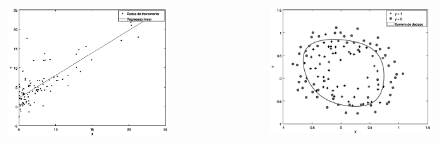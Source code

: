 \documentclass[10pt]{beamer}
\begin{document}
\begin{frame}[fragile]
{  \begin{columns}[onlytextwidth]
    \begin{figure}[htb]
    \begin{center}
        \includegraphics[width=\textwidth]{img/regressao2x.png}
    \end{center}
    \end{figure}  
    

    \begin{figure}[htb]
    \begin{center}
        \includegraphics[width=\textwidth]{img/classificacao2x.png}
    \end{center}
    \end{figure}  


  \end{columns}

    

  }


  

\end{frame}
\end{document}
